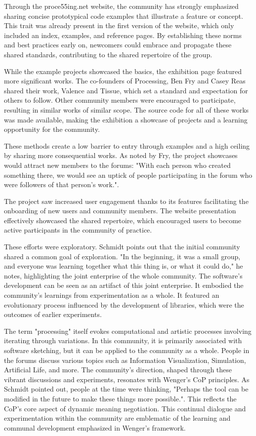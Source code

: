 Through the proce55ing.net website, the community has strongly emphasized sharing concise prototypical code examples that illustrate a feature or concept. This trait was already present in the first version of the website, which only included an index, examples, and reference pages. By establishing these norms and best practices early on, newcomers could embrace and propagate these shared standards, contributing to the shared repertoire of the group. 

While the example projects showcased the basics, the exhibition page featured more significant works. The co-founders of Processing, Ben Fry and Casey Reas shared their work, Valence and Tissue, which set a standard and expectation for others to follow. Other community members were encouraged to participate, resulting in similar works of similar scope. The source code for all of these works was made available, making the exhibition a showcase of projects and a learning opportunity for the community.

These methods create a low barrier to entry through examples and a high ceiling by sharing more consequential works. As noted by Fry, the project showcases would attract new members to the forums: "With each person who created something there, we would see an uptick of people participating in the forum who were followers of that person's work.".

The project saw increased user engagement thanks to its features facilitating the onboarding of new users and community members. The website presentation effectively showcased the shared repertoire, which encouraged users to become active participants in the community of practice.

These efforts were exploratory. Schmidt points out that the initial community shared a common goal of exploration. "In the beginning, it was a small group, and everyone was learning together what this thing is, or what it could do," he notes, highlighting the joint enterprise of the whole community. The software's development can be seen as an artifact of this joint enterprise. It embodied the community's learnings from experimentation as a whole. It featured an evolutionary process influenced by the development of libraries, which were the outcomes of earlier experiments.

The term "processing" itself evokes computational and artistic processes involving iterating through variations. In this community, it is primarily associated with software sketching, but it can be applied to the community as a whole. People in the forums discuss various topics such as Information Visualization, Simulation, Artificial Life, and more. 
The community's direction, shaped through these vibrant discussions and experiments, resonates with Wenger's CoP principles. As Schmidt pointed out, people at the time were thinking, "Perhaps the tool can be modified in the future to make these things more possible.". This reflects the CoP's core aspect of dynamic meaning negotiation. This continual dialogue and experimentation within the community are emblematic of the learning and communal development emphasized in Wenger's framework.

